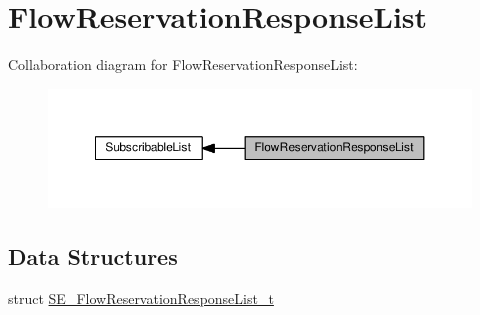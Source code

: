 \hypertarget{group__FlowReservationResponseList}{}\section{Flow\+Reservation\+Response\+List}
\label{group__FlowReservationResponseList}
Collaboration diagram for Flow\+Reservation\+Response\+List\+:\nopagebreak
\begin{figure}[H]
\begin{center}
\leavevmode
\includegraphics[width=350pt]{group__FlowReservationResponseList}
\end{center}
\end{figure}
\subsection*{Data Structures}
\begin{DoxyCompactItemize}
\item 
struct \hyperlink{structSE__FlowReservationResponseList__t}{S\+E\+\_\+\+Flow\+Reservation\+Response\+List\+\_\+t}
\end{DoxyCompactItemize}
